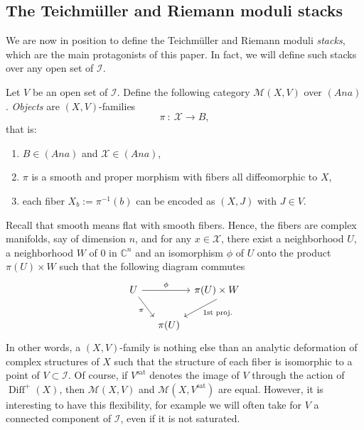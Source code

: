 \documentclass[JEP,XML,SOM,Unicode]{cedram}
\let\mathcal\mathscr
\newcommand{\Ana}{\mathit{Ana}}
\newcommand{\sat}{\mathrm{sat}}
\DeclareMathOperator{\Diff}{Diff}
\theoremstyle{plain}
\theoremstyle{definition}
\theoremstyle{remark}
\numberwithin{equation}{section}
\newcommand{\CC}{{\mathbb{C}}}
\newcommand{\cI}{\mathcal{I}}
\begin{document}
\subsection{The Teichmüller and Riemann moduli stacks}
\label{stacks}
We are now in position to define the Teichmüller and Riemann moduli \emph{stacks}, which are the main protagonists of this paper. In fact, we will define such stacks over any open set of $\cI$.

Let $V$ be an open set of $\cI$. Define the following category $\mathcal M(X,V)$ over $(\Ana)$. \emph{Objects} are $(X, V)$-families
\begin{equation}
\label{XVfamily}
\pi\ :\ \mathcal X\longrightarrow B,
\end{equation}
that is:
\begin{enumerate}
\item
$B\in (\Ana)$ and $\mathcal X\in(\Ana)$,

\item
$\pi$ is a smooth and proper morphism with fibers all diffeomorphic to $X$,

\item
each fiber $X_b:=\pi^{-1}(b)$ can be encoded as $(X, J)$ with $J\in V$.
\end{enumerate}
Recall that smooth means flat with smooth fibers. Hence, the fibers are complex manifolds, say of dimension $n$, and for any $x\in\mathcal X$, there exist a neighborhood $U$, a neighborhood $W$ of $0$ in $\CC^n$ and an isomorphism $\phi$ of $U$ onto the product $\pi(U)\times W$ such that the following diagram commutes
\begin{equation}
\label{flatness}
\begin{tikzcd}[column sep=tiny, row sep=normal]
U \arrow[rrr,"\phi"] \arrow[rrd, end anchor = north west,"\pi"'] &&&\pi(U)\times W\arrow[dl, start anchor = south, end anchor = north east,"\text{1st proj.}"]\\
&&\pi (U)&
\end{tikzcd}
\end{equation}
In other words, a $(X, V)$-family is nothing else than an analytic deformation of complex structures of $X$ such that the structure of each fiber is isomorphic to a point of $V\subset \cI$. Of course, if $V^{\sat}$ denotes the image of $V$ through the action of $\Diff^+(X)$, then $\mathcal M(X,V)$ and $\mathcal M(X,V^{\sat})$ are equal. However, it is interesting to have this flexibility, for example we will often take for $V$ a connected component of $\cI$, even if it is not saturated.
\end{document}
